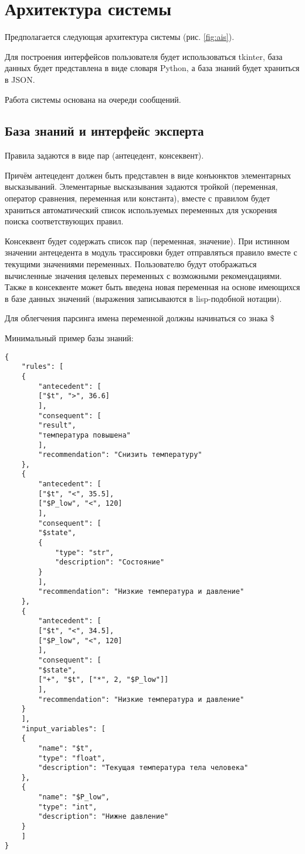 \section{Архитектура системы}

Предполагается следующая архитектура системы (рис. \ref{fig:ais}).


Для построения интерфейсов пользователя будет использоваться tkinter, база данных будет представлена в виде словаря Python, а база знаний будет храниться в JSON.

Работа системы основана на очереди сообщений.

\subsection{База знаний и интерфейс эксперта}

Правила задаются в виде пар (антецедент, консеквент).

Причём антецедент должен быть представлен в виде конъюнктов элементарных высказываний.
Элементарные высказывания задаются тройкой (переменная, оператор сравнения, переменная или константа),
вместе с правилом будет храниться автоматический список используемых переменных для ускорения поиска соответствующих правил.

Консеквент будет содержать список пар (переменная, значение).
При истинном значении антецедента в модуль трассировки будет отправляться правило вместе с текущими значениями переменных.
Пользователю будут отображаться вычисленные значения целевых переменных с возможными рекомендациями.
Также в консеквенте может быть введена новая переменная на основе имеющихся в базе данных значений (выражения записываются в lisp-подобной нотации).

Для облегчения парсинга имена переменной должны начинаться со знака \$

Минимальный пример базы знаний:


\begin{lstlisting}
{
	"rules": [
	{
		"antecedent": [
		["$t", ">", 36.6]
		],
		"consequent": [
		"result",
		"температура повышена"
		],
		"recommendation": "Снизить температуру"
	},
	{
		"antecedent": [
		["$t", "<", 35.5],
		["$P_low", "<", 120]
		],
		"consequent": [
		"$state",
		{
			"type": "str",
			"description": "Состояние"
		}
		],
		"recommendation": "Низкие температура и давление"
	},
	{
		"antecedent": [
		["$t", "<", 34.5],
		["$P_low", "<", 120]
		],
		"consequent": [
		"$state",
		["+", "$t", ["*", 2, "$P_low"]]
		],
		"recommendation": "Низкие температура и давление"
	}
	],
	"input_variables": [
	{
		"name": "$t",
		"type": "float",
		"description": "Текущая температура тела человека"
	},
	{
		"name": "$P_low",
		"type": "int",
		"description": "Нижне давление"
	}
	]
}
\end{lstlisting}


